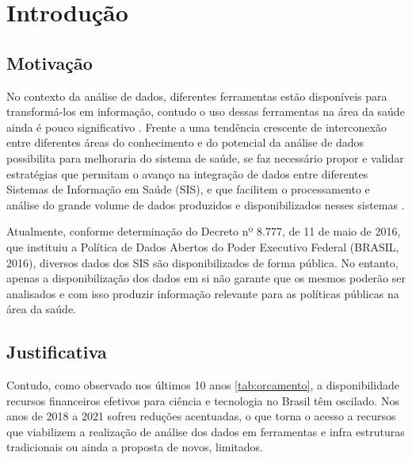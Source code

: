 
\chapter{Introdução}
\label{chap:introducao}

\section{Motivação}
\label{sec:motivacao}

No contexto da análise de dados, diferentes ferramentas estão disponíveis para transformá-los em informação, contudo o uso dessas ferramentas na área da saúde ainda é pouco significativo \cite{galvao_desafios_2019}. Frente a uma tendência crescente de interconexão entre diferentes áreas do conhecimento e do potencial da análise de dados possibilita para melhoraria do sistema de saúde, se faz necessário propor e validar estratégias que permitam o avanço na integração de dados entre diferentes Sistemas de Informação em Saúde (SIS), e que facilitem o processamento e análise do grande volume de dados produzidos e disponibilizados nesses sistemas \cite{galvao_desafios_2019,mehta_concurrence_2018}. 

Atualmente, conforme determinação do Decreto nº 8.777, de 11 de maio de 2016, que instituiu a Política de Dados Abertos do Poder Executivo Federal (BRASIL, 2016), diversos dados dos SIS são disponibilizados de forma pública. No entanto, apenas a disponibilização dos dados em si não garante que os mesmos poderão ser analisados e com isso produzir informação relevante para as políticas públicas na área da saúde. 

\section{Justificativa}
\label{sec:justificativa}

Contudo, como observado nos últimos 10 anos \ref{tab:orcamento}, a disponibilidade recursos financeiros efetivos para ciência e tecnologia no Brasil têm oscilado. Nos anos de 2018 a 2021 sofreu reduções acentuadas, o que torna o acesso a recursos que viabilizem a realização de análise dos dados em ferramentas e infra estruturas tradicionais ou ainda a proposta de novos, limitados.

